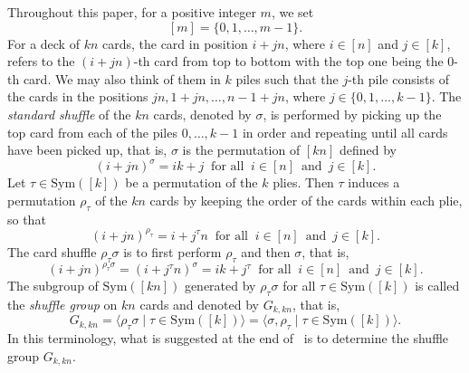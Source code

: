 \documentclass[11pt,a4paper,reqno]{amsart}
\newcommand{\Sym}{\mathrm{Sym}}
\theoremstyle{definition}
\begin{document}
{\begin{center}
\end{center}
}
\vspace{12pt}

Throughout this paper, for a positive integer $m$, we set
\[
[m]=\{0,1,\ldots,m-1\}.
\]
For a deck of $kn$ cards, the card in position $i+jn$, where $i\in[n]$ and $j\in[k]$, refers to the $(i+jn)$-th card from top to bottom with the top one being the $0$-th card.
We may also think of them in $k$ piles such that the $j$-th pile consists of the cards in the positions $jn,1+jn,\dots,n-1+jn$, where $j\in\{0,1,\dots,k-1\}$.
The \emph{standard shuffle} of the $kn$ cards, denoted by $\sigma$, is performed by picking up the top card from each of the piles $0,\dots,k-1$ in order and repeating until all cards have been picked up, that is, $\sigma$ is the permutation of $[kn]$ defined by
\[
(i+jn)^{\sigma}=ik+j\ \text{ for all }\ i\in[n]\,\text{ and }\,j\in[k].
\]
Let $\tau\in\Sym([k])$ be a permutation of the $k$ plies. Then $\tau$ induces a permutation $\rho_\tau$ of the $kn$ cards by keeping the order of the cards within each plie, so that
\begin{equation}\label{Eqn:rho}
(i+jn)^{\rho_\tau}=i+j^\tau n\ \text{ for all }\ i\in[n]\,\text{ and }\,j\in[k].
\end{equation}
The card shuffle $\rho_\tau\sigma$ is to first perform $\rho_\tau$ and then $\sigma$, that is,
\[
(i+jn)^{\rho_\tau\sigma}=(i+j^\tau n)^{\sigma}=ik+j^\tau\ \text{ for all }\ i\in[n]\,\text{ and }\,j\in[k].
\]
The subgroup of $\Sym([kn])$ generated by $\rho_\tau\sigma$ for all $\tau\in\Sym([k])$ is called the \emph{shuffle group} on $kn$ cards and denoted by $G_{k,kn}$, that is,
\[
G_{k,kn}=\langle\rho_\tau\sigma\mid\tau\in\Sym([k])\rangle=\langle\sigma,\rho_\tau\mid\tau\in\Sym([k])\rangle.
\]
In this terminology, what is suggested at the end of~\cite{DGK1983} is to determine the shuffle group $G_{k,kn}$.
\end{document}

